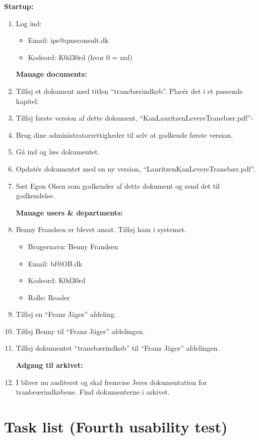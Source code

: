 \textbf{Startup:}
\begin{enumerate}
	\item Log ind:
		\begin{itemize}
			\item Email: ips@qmsconsult.dk
			\item Kodeord: K0d30rd   (hvor 0 = nul)
		\end{itemize}

\textbf{Manage documents:}
	\item Tilføj et dokument med titlen “tranebærindkøb”. Placér det i et passende kapitel.
	\item Tilføj første version af dette dokument, “KanLauritzenLevereTranebær.pdf”-
	\item Brug dine administratorrettigheder til selv at godkende første version.
	\item Gå ind og læs dokumentet.
	\item Opdatér dokumentet med en ny version, “LauritzenKanLevereTranebær.pdf”.
	\item Sæt Egon Olsen som godkender af dette dokument og send det til godkendelse.

\textbf{Manage users \& departments:}
	\item Benny Frandsen er blevet ansat. Tilføj ham i systemet.
		\begin{itemize}
			\item Brugernavn: Benny Frandsen
			\item Email: bf@OB.dk
			\item Kodeord: K0d30rd
			\item Rolle: Reader
		\end{itemize}
	\item Tilføj en “Franz Jäger” afdeling.
	\item Tilføj Benny til “Franz Jäger” afdelingen.
	\item Tilføj dokumentet “tranebærindkøb” til “Franz Jäger” afdelingen.

\textbf{Adgang til arkivet:}
	\item I bliver nu auditeret og skal fremvise Jeres dokumentation for tranbeærindkøbene. Find dokumenterne i arkivet.
\end{enumerate}


\section{Task list (Fourth usability test)} \label{sec:utest4tasklist}

